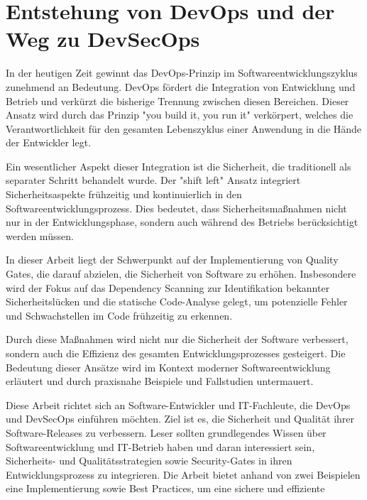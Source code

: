 \section{Entstehung von DevOps und der Weg zu DevSecOps}
In der heutigen Zeit gewinnt das DevOps-Prinzip im Softwareentwicklungszyklus zunehmend an Bedeutung. DevOps fördert die Integration von Entwicklung und Betrieb und verkürzt die bisherige Trennung zwischen diesen Bereichen. Dieser Ansatz wird durch das Prinzip "you build it, you run it" verkörpert, welches die Verantwortlichkeit für den gesamten Lebenszyklus einer Anwendung in die Hände der Entwickler legt.

Ein wesentlicher Aspekt dieser Integration ist die Sicherheit, die traditionell als separater Schritt behandelt wurde. Der "shift left" Ansatz integriert Sicherheitsaspekte frühzeitig und kontinuierlich in den Softwareentwicklungsprozess. Dies bedeutet, dass Sicherheitsmaßnahmen nicht nur in der Entwicklungsphase, sondern auch während des Betriebs berücksichtigt werden müssen.

In dieser Arbeit liegt der Schwerpunkt auf der Implementierung von Quality Gates, die darauf abzielen, die Sicherheit von Software zu erhöhen. Insbesondere wird der Fokus auf das Dependency Scanning zur Identifikation bekannter Sicherheitslücken und die statische Code-Analyse gelegt, um potenzielle Fehler und Schwachstellen im Code frühzeitig zu erkennen.

Durch diese Maßnahmen wird nicht nur die Sicherheit der Software verbessert, sondern auch die Effizienz des gesamten Entwicklungsprozesses gesteigert. Die Bedeutung dieser Ansätze wird im Kontext moderner Softwareentwicklung erläutert und durch praxisnahe Beispiele und Fallstudien untermauert.


Diese Arbeit richtet sich an Software-Entwickler und IT-Fachleute, die DevOps und DevSecOps einführen möchten. Ziel ist es, die Sicherheit und Qualität ihrer Software-Releases zu verbessern. Leser sollten grundlegendes Wissen über Softwareentwicklung und IT-Betrieb haben und daran interessiert sein, Sicherheits- und Qualitätsstrategien sowie Security-Gates in ihren Entwicklungsprozess zu integrieren. Die Arbeit bietet anhand von zwei Beispielen eine Implementierung sowie Best Practices, um eine sichere und effiziente